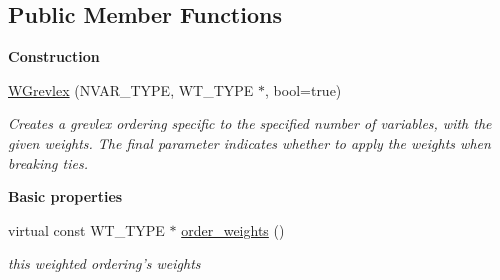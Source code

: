 \subsection*{Public Member Functions}
\begin{Indent}\textbf{ Construction}\par
\begin{DoxyCompactItemize}
\item 
\mbox{\label{class_w_grevlex_a0ac3e66fb20c098427f6a08c92fd3771}} 
\hyperlink{class_w_grevlex_a0ac3e66fb20c098427f6a08c92fd3771}{W\+Grevlex} (N\+V\+A\+R\+\_\+\+T\+Y\+PE, W\+T\+\_\+\+T\+Y\+PE $\ast$, bool=true)
\begin{DoxyCompactList}\small\item\em Creates a grevlex ordering specific to the specified number of variables, with the given weights. The final parameter indicates whether to apply the weights when breaking ties. \end{DoxyCompactList}\end{DoxyCompactItemize}
\end{Indent}
\begin{Indent}\textbf{ Basic properties}\par
\begin{DoxyCompactItemize}
\item 
\mbox{\label{class_w_grevlex_ac7977e728603aeff912e91b2c11bf236}} 
virtual const W\+T\+\_\+\+T\+Y\+PE $\ast$ \hyperlink{class_w_grevlex_ac7977e728603aeff912e91b2c11bf236}{order\+\_\+weights} ()
\begin{DoxyCompactList}\small\item\em this weighted ordering's weights \end{DoxyCompactList}\end{DoxyCompactItemize}
\end{Indent}
